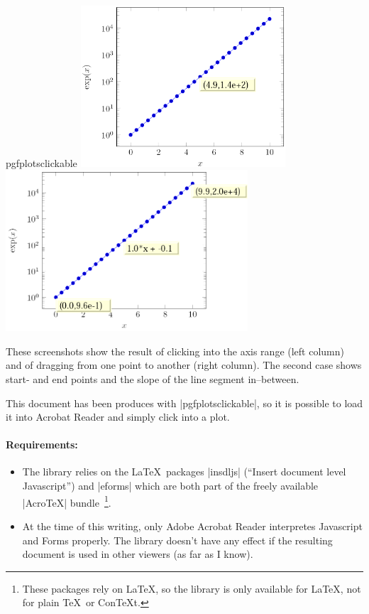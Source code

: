 \begin{tikzlibrary}{pgfplotsclickable}
	\includegraphics[height=6cm]{figures/pgfplotsclickable-fig3.png}
	\includegraphics[height=6cm]{figures/pgfplotsclickable-fig4.png}

	\nobreak
	These screenshots show the result of clicking into the axis range (left column) and of dragging from one point to another (right column). The second case shows start- and end points and the slope of the line segment in--between.

	This document has been produces with |pgfplotsclickable|, so it is possible to load it into Acrobat Reader and simply click into a plot.

	\paragraph{Requirements:}
	\begin{itemize}
		\item The library relies on the \LaTeX\ packages |insdljs| (``Insert document level Javascript'') and |eforms| which are both part of the freely available |AcroTeX| bundle~\cite{acrotex}\footnote{These packages rely on \LaTeX, so the library is only available for \LaTeX, not for plain \TeX\ or Con\TeX t.}.
		
		\item At the time of this writing, only Adobe Acrobat Reader interpretes Javascript and Forms properly. The library doesn't have any effect if the resulting document is used in other viewers (as far as I know).
	\end{itemize}
\end{tikzlibrary}

